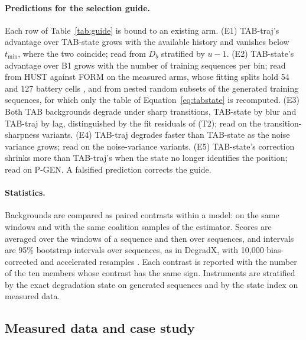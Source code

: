 \documentclass{article}
\begin{document}
\paragraph{Predictions for the selection guide.} Each row of Table~\ref{tab:guide} is bound to an existing arm. (E1) TAB-traj's advantage over TAB-state grows with the available history and vanishes below $t_{\min}$, where the two coincide; read from $D_b$ stratified by $u-1$. (E2) TAB-state's advantage over B1 grows with the number of training sequences per bin; read from HUST against FORM on the measured arms, whose fitting splits hold 54 and 127 battery cells \citep{degradx2026}, and from nested random subsets of the generated training sequences, for which only the table of Equation~\eqref{eq:tabstate} is recomputed. (E3) Both TAB backgrounds degrade under sharp transitions, TAB-state by blur and TAB-traj by lag, distinguished by the fit residuals of (T2); read on the transition-sharpness variants. (E4) TAB-traj degrades faster than TAB-state as the noise variance grows; read on the noise-variance variants. (E5) TAB-state's correction shrinks more than TAB-traj's when the state no longer identifies the position; read on P-GEN. A falsified prediction corrects the guide.

\paragraph{Statistics.} Backgrounds are compared as paired contrasts within a model: on the same windows and with the same coalition samples of the estimator. Scores are averaged over the windows of a sequence and then over sequences, and intervals are 95\% bootstrap intervals over sequences, as in DegradX, with 10{,}000 bias-corrected and accelerated resamples \citep{degradx2026, degradxrepo}. Each contrast is reported with the number of the ten members whose contrast has the same sign. Instruments are stratified by the exact degradation state on generated sequences and by the state index on measured data.

\subsection{Measured data and case study}\label{sec:eval:measured}
\end{document}
